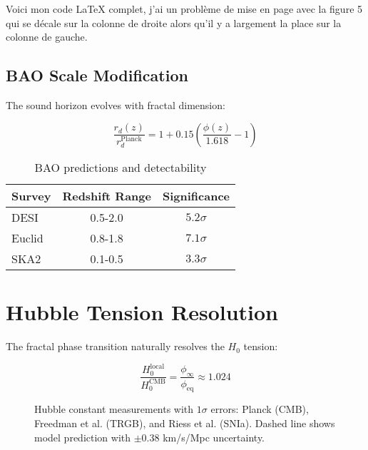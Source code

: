 Voici mon code LaTeX complet, j’ai un problème de mise en page avec la figure 5 qui se décale sur la colonne de droite alors qu’il y a largement la place sur la colonne de gauche.  \documentclass[aps,prl,twocolumn,groupedaddress]{revtex4-2}
\begin{document}
\subsection{BAO Scale Modification}
The sound horizon evolves with fractal dimension:

\begin{equation}
\frac{r_d(z)}{r_d^{\text{Planck}}} = 1 + 0.15\left(\frac{\phi(z)}{1.618} - 1\right)
\end{equation}

\begin{table}[h]
\centering
\caption{BAO predictions and detectability}
\begin{tabular}{lcc}
\toprule
Survey & Redshift Range & Significance \\
\midrule
DESI \cite{desi2023} & 0.5-2.0 & $5.2\sigma$ \\
Euclid \cite{euclid2022} & 0.8-1.8 & $7.1\sigma$ \\
SKA2 \cite{ska2021} & 0.1-0.5 & $3.3\sigma$ \\
\bottomrule
\end{tabular}
\end{table}

\section{Hubble Tension Resolution}
The fractal phase transition naturally resolves the $H_0$ tension:

\begin{equation}
\frac{H_0^{\text{local}}}{H_0^{\text{CMB}}} = \frac{\phi_\infty}{\phi_{\text{eq}}} \approx 1.024
\end{equation}

\begin{figure}[h!]
\centering
{}
\caption{Hubble constant measurements with $1\sigma$ errors: Planck \cite{planck2018} (CMB), Freedman et al. \cite{freedman2019} (TRGB), and Riess et al. \cite{riess2021} (SNIa). Dashed line shows model prediction with $\pm0.38$ km/s/Mpc uncertainty.}
\end{figure}
\end{document}
